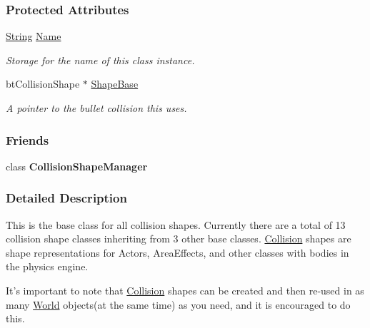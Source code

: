 \subsubsection*{Protected Attributes}
\begin{DoxyCompactItemize}
\item 
\hypertarget{classMezzanine_1_1CollisionShape_aac524c5c56fa4d158bc071f8aecfbe79}{
\hyperlink{namespaceMezzanine_acf9fcc130e6ebf08e3d8491aebcf1c86}{String} \hyperlink{classMezzanine_1_1CollisionShape_aac524c5c56fa4d158bc071f8aecfbe79}{Name}}
\label{classMezzanine_1_1CollisionShape_aac524c5c56fa4d158bc071f8aecfbe79}

\begin{DoxyCompactList}\small\item\em Storage for the name of this class instance. \item\end{DoxyCompactList}\item 
\hypertarget{classMezzanine_1_1CollisionShape_a105322f4ad5139768ca1abba44561dec}{
btCollisionShape $\ast$ \hyperlink{classMezzanine_1_1CollisionShape_a105322f4ad5139768ca1abba44561dec}{ShapeBase}}
\label{classMezzanine_1_1CollisionShape_a105322f4ad5139768ca1abba44561dec}

\begin{DoxyCompactList}\small\item\em A pointer to the bullet collision this uses. \item\end{DoxyCompactList}\end{DoxyCompactItemize}
\subsubsection*{Friends}
\begin{DoxyCompactItemize}
\item 
\hypertarget{classMezzanine_1_1CollisionShape_a3989497c48c3690f2d73227804a47a77}{
class {\bfseries CollisionShapeManager}}
\label{classMezzanine_1_1CollisionShape_a3989497c48c3690f2d73227804a47a77}

\end{DoxyCompactItemize}


\subsubsection{Detailed Description}
This is the base class for all collision shapes. Currently there are a total of 13 collision shape classes inheriting from 3 other base classes. \hyperlink{classMezzanine_1_1Collision}{Collision} shapes are shape representations for Actors, AreaEffects, and other classes with bodies in the physics engine. \par
 \par
 It's important to note that \hyperlink{classMezzanine_1_1Collision}{Collision} shapes can be created and then re-\/used in as many \hyperlink{classMezzanine_1_1World}{World} objects(at the same time) as you need, and it is encouraged to do this. 

